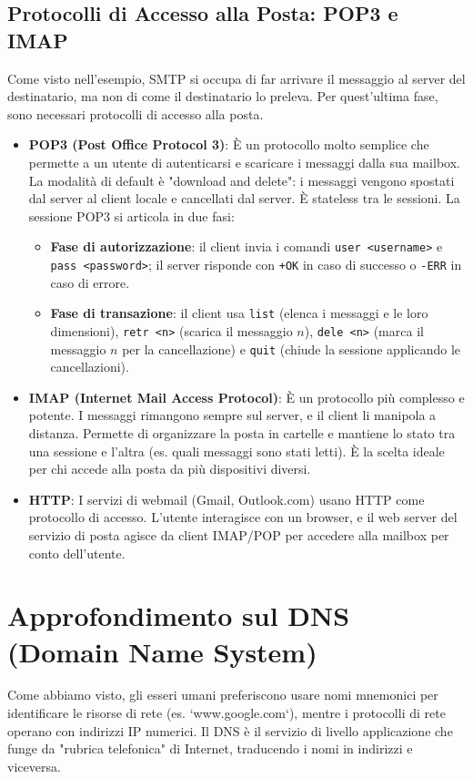 \subsection{Protocolli di Accesso alla Posta: POP3 e IMAP}
Come visto nell'esempio, SMTP si occupa di far arrivare il messaggio al server del destinatario, ma non di come il destinatario lo preleva. Per quest'ultima fase, sono necessari protocolli di accesso alla posta.
\begin{itemize}
    \item \textbf{POP3 (Post Office Protocol 3)}: È un protocollo molto semplice che permette a un utente di autenticarsi e scaricare i messaggi dalla sua mailbox. La modalità di default è "download and delete": i messaggi vengono spostati dal server al client locale e cancellati dal server. È stateless tra le sessioni. La sessione POP3 si articola in due fasi:
    \begin{itemize}
        \item \textbf{Fase di autorizzazione}: il client invia i comandi \texttt{user <username>} e \texttt{pass <password>}; il server risponde con \texttt{+OK} in caso di successo o \texttt{-ERR} in caso di errore.
        \item \textbf{Fase di transazione}: il client usa \texttt{list} (elenca i messaggi e le loro dimensioni), \texttt{retr <n>} (scarica il messaggio $n$), \texttt{dele <n>} (marca il messaggio $n$ per la cancellazione) e \texttt{quit} (chiude la sessione applicando le cancellazioni).
    \end{itemize}
    \item \textbf{IMAP (Internet Mail Access Protocol)}: È un protocollo più complesso e potente. I messaggi rimangono sempre sul server, e il client li manipola a distanza. Permette di organizzare la posta in cartelle e mantiene lo stato tra una sessione e l'altra (es. quali messaggi sono stati letti). È la scelta ideale per chi accede alla posta da più dispositivi diversi.
    \item \textbf{HTTP}: I servizi di webmail (Gmail, Outlook.com) usano HTTP come protocollo di accesso. L'utente interagisce con un browser, e il web server del servizio di posta agisce da client IMAP/POP per accedere alla mailbox per conto dell'utente.
\end{itemize}

\section{Approfondimento sul DNS (Domain Name System)}
Come abbiamo visto, gli esseri umani preferiscono usare nomi mnemonici per identificare le risorse di rete (es. `www.google.com`), mentre i protocolli di rete operano con indirizzi IP numerici. Il DNS è il servizio di livello applicazione che funge da "rubrica telefonica" di Internet, traducendo i nomi in indirizzi e viceversa.

